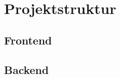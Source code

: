 \chapter{Projektstruktur}

\section{Frontend}
\label{sec:struktur-frontend}

\section{Backend}
\label{sec:struktur-backend}

